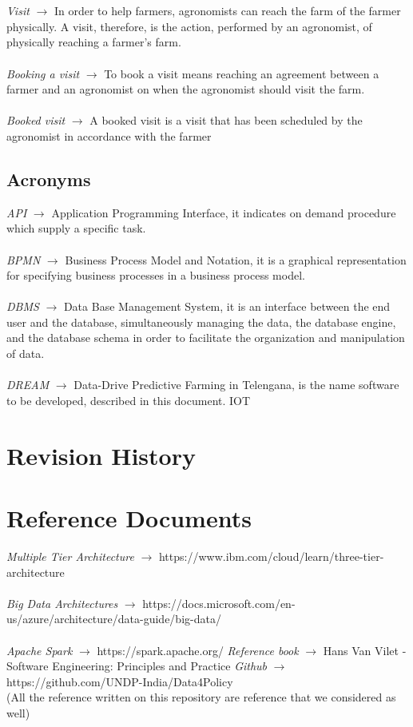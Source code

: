 \documentclass[10pt]{report}
\begin{document}
    \\ \\
    \emph{Visit} $\rightarrow$ In order to help farmers, agronomists can reach the farm of the farmer physically. A visit, therefore, is the action, performed by an agronomist, of physically reaching a farmer's farm.
    \\ \\
    \emph{Booking a visit} $\rightarrow$ To book a visit means reaching an agreement between a farmer and an agronomist on when the agronomist should visit the farm.
    \\ \\
    \emph{Booked visit} $\rightarrow$ A booked visit is a visit that has been scheduled by the agronomist in accordance with the farmer
    \subsection{Acronyms}
    \emph{API} $\rightarrow$ Application Programming Interface, it indicates on demand procedure which supply a specific task.\\ \\
    \emph{BPMN} $\rightarrow$ Business Process Model and Notation, it is a graphical representation for specifying business processes in a business process model.\\ \\
    \emph{DBMS} $\rightarrow$ Data Base Management System, it is an interface between the end user and the database, simultaneously managing the data, the database engine, and the database schema in order to facilitate the organization and manipulation of data.\\ \\
    \emph{DREAM} $\rightarrow$ Data-Drive Predictive Farming in Telengana, is the name software to be developed, described in this document.
    IOT
\section{Revision History}
\section{Reference Documents}
\emph{Multiple Tier Architecture} $\rightarrow$ https://www.ibm.com/cloud/learn/three-tier-architecture\\ \\
\emph{Big Data Architectures} $\rightarrow$ https://docs.microsoft.com/en-us/azure/architecture/data-guide/big-data/\\ \\
\emph{Apache Spark} $\rightarrow$ https://spark.apache.org/
\emph{Reference book} $\rightarrow$ Hans Van Vilet - Software Engineering: Principles and Practice
\emph{Github} $\rightarrow$ https://github.com/UNDP-India/Data4Policy\\ (All the reference written on this repository are reference that we considered as well)
\end{document}
